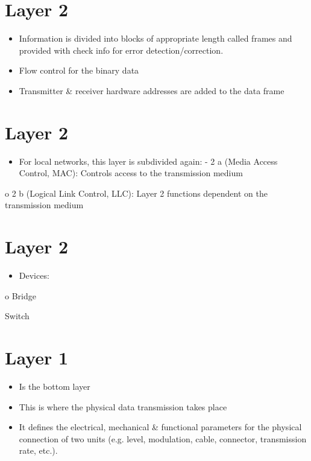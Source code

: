 \documentclass[10pt]{article}
\begin{document}
\section{Layer 2}
\begin{itemize}
  \item Information is divided into blocks of appropriate length called frames and provided with check info for error detection/correction.

  \item Flow control for the binary data

  \item Transmitter \& receiver hardware addresses are added to the data frame

\end{itemize}

\section{Layer 2}
\begin{itemize}
  \item For local networks, this layer is subdivided again: - 2 a (Media Access Control, MAC): Controls access to the transmission medium
\end{itemize}

o 2 b (Logical Link Control, LLC): Layer 2 functions dependent on the transmission medium

\section{Layer 2}
\begin{itemize}
  \item Devices:
\end{itemize}

o Bridge

Switch

\section{Layer 1}
\begin{itemize}
  \item Is the bottom layer

  \item This is where the physical data transmission takes place

  \item It defines the electrical, mechanical \& functional parameters for the physical connection of two units (e.g. level, modulation, cable, connector, transmission rate, etc.).

\end{itemize}
\end{document}

